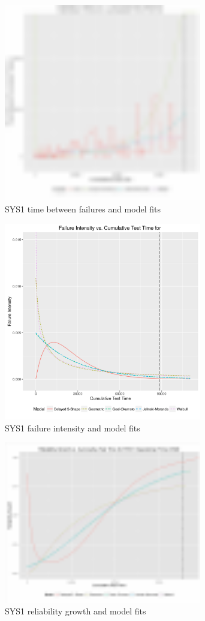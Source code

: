\documentclass[conference]{IEEEtran}
\begin{document}
\begin{figure}[!h]
\centering
\includegraphics[width=3.4in]{Figures/TBF}
\caption{SYS1 time between failures and model fits}
\label{fig_TBF}
\end{figure}

\begin{figure}[!h]
\centering
\includegraphics[width=3.4in]{Figures/FI}
\caption{SYS1 failure intensity and model fits}
\label{fig_FI}
\end{figure}

\begin{figure}[!h]
\centering
\includegraphics[width=3.4in]{Figures/Reliability_growth}
\caption{SYS1 reliability growth and model fits}
\label{fig_RG}
\end{figure}
\end{document}

